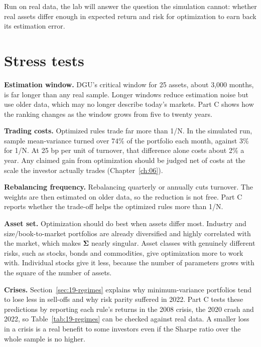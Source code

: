 Run on real data, the lab will answer the question the simulation cannot: whether real assets differ enough in expected return and risk for optimization to earn back its estimation error.

\section{Stress tests}
\label{sec:19-stress}

\textbf{Estimation window.} DGU's critical window for 25 assets, about 3,000 months, is far longer than any real sample. Longer windows reduce estimation noise but use older data, which may no longer describe today's markets. Part C shows how the ranking changes as the window grows from five to twenty years.

\textbf{Trading costs.} Optimized rules trade far more than 1/N. In the simulated run, sample mean-variance turned over 74\% of the portfolio each month, against 3\% for 1/N. At 25 bp per unit of turnover, that difference alone costs about 2\% a year. Any claimed gain from optimization should be judged net of costs at the scale the investor actually trades (Chapter~\ref{ch:06}).

\textbf{Rebalancing frequency.} Rebalancing quarterly or annually cuts turnover. The weights are then estimated on older data, so the reduction is not free. Part C reports whether the trade-off helps the optimized rules more than 1/N.

\textbf{Asset set.} Optimization should do best when assets differ most. Industry and size/book-to-market portfolios are already diversified and highly correlated with the market, which makes $\boldsymbol{\Sigma}$ nearly singular. Asset classes with genuinely different risks, such as stocks, bonds and commodities, give optimization more to work with. Individual stocks give it less, because the number of parameters grows with the square of the number of assets.

\textbf{Crises.} Section~\ref{sec:19-regimes} explains why minimum-variance portfolios tend to lose less in sell-offs and why risk parity suffered in 2022. Part C tests these predictions by reporting each rule's returns in the 2008 crisis, the 2020 crash and 2022, so Table~\ref{tab:19-regimes} can be checked against real data. A smaller loss in a crisis is a real benefit to some investors even if the Sharpe ratio over the whole sample is no higher.

